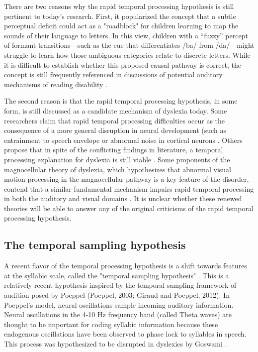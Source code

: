 \documentclass[../uwthesis.tex]{subfiles}
\begin{document}
There are two reasons why the rapid temporal processing hypothesis is still pertinent to today's research. First, it popularized the concept that a subtle perceptual deficit could act as a "roadblock" for children learning to map the sounds of their language to letters. In this view, children with a “fuzzy” percept of formant transitions---such as the cue that
differentiates /ba/ from /da/---might struggle to learn how those ambiguous categories relate to discrete letters. While it is difficult to establish whether this proposed causal pathway is correct, the concept is still frequently referenced in discussions of potential auditory mechanisms of reading disability \citep{Goswami2015SensoryResearch,Calcus2016,Ziegler2009}. 

The second reason is that the rapid temporal processing hypothesis, in some form, is still discussed as a candidate mechanism of dyslexia today. Some researchers claim that rapid temporal processing difficulties occur as the consequence of a more general disruption in neural development (such as entrainment to speech envelope \citep{Goswami2015SensoryResearch} or abnormal noise in cortical neurons \citep{Hancock2017NeuralDyslexia}. Others propose that in spite of the conflicting findings in literature, a temporal processing explanation for dyslexia is still viable \citep{Vandermosten2010,Vandermosten2011}. Some proponents of the magnocellular theory of dyslexia, which hypothesizes that abnormal visual motion processing in the magnocellular pathway is a key feature of the disorder, contend that a similar fundamental mechanism impairs rapid temporal processing in both the auditory and visual domains \citep{Stein2018TheDyslexia,Casini2018ItsDyslexia,Witton2002}. It is unclear whether these renewed theories will be able to answer any of the original criticisms of the rapid temporal processing hypothesis.


\subsection{The temporal sampling hypothesis}
A recent flavor of the temporal processing hypothesis is a shift towards features at the syllabic scale, called the "temporal sampling hypothesis" \citep{Goswami2011}. This is a relatively recent hypothesis inspired by the temporal sampling framework of audition posed by Poeppel (Poeppel, 2003; Giraud and Poeppel, 2012). In Poeppel’s model, neural oscillations sample incoming auditory information. Neural oscillations in the 4-10 Hz frequency band (called Theta waves) are thought to be important for coding syllabic information because these endogenous oscillations have been observed to phase lock to syllables in
speech. This process was hypothesized to be disrupted in dyslexics by Goswami \citep{Goswami2011ADyslexia}.
\end{document}
